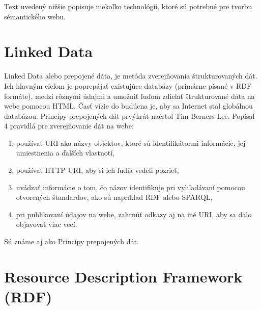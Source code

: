 \documentclass[12pt, a4paper, oneside]{book}
\begin{document}
Text uvedený nižšie popisuje niekoľko technológií, ktoré sú potrebné pre tvorbu sémantického webu.

\section{Linked Data}



Linked Data \cite{linkeddata} alebo prepojené dáta, je metóda zverejňovania štrukturovaných dát. Ich hlavným cieľom je poprepájať existujúce databázy (primárne písané v RDF formáte), medzi rôznymi údajmi a umožniť ľuďom zdielať štrukturované dáta na webe pomocou HTML. Časť vízie do budúcna je, aby sa Internet stal globálnou databázou. Princípy prepojených dát prvýkrát načrtol Tim Berners-Lee. Popísal 4 pravidlá pre zverejňovanie dát na webe:
\begin{enumerate}
  \item používať URI ako názvy objektov, ktoré sú identifikátormi informácie, jej umiestnenia a ďalších vlastnotí,
  \item používať HTTP URI, aby si ich ľudia vedeli pozrieť,
  \item uvádzať informácie o tom, čo názov identifikuje pri vyhľadávaní pomocou otvorených štandardov, ako sú napríklad RDF alebo SPARQL,
  \item pri publikovaní údajov na webe, zahrnúť odkazy aj na iné URI, aby sa dalo objavovať viac vecí.
\end{enumerate}
Sú známe aj ako Princípy prepojených dát.



\section{Resource Description Framework (RDF)}
\end{document}
